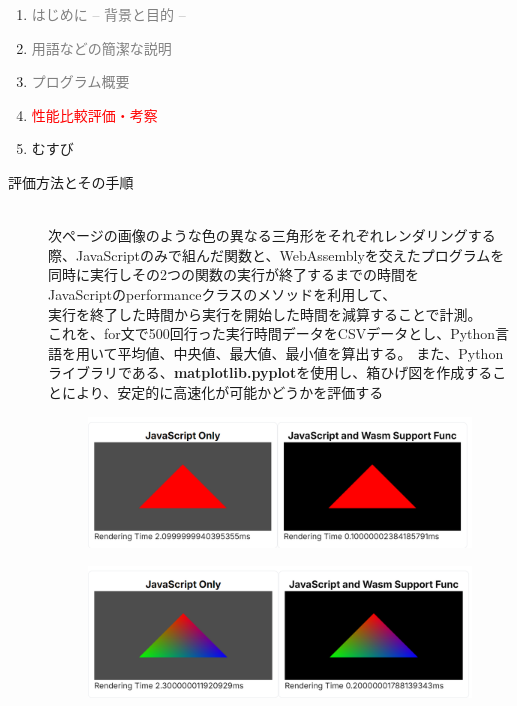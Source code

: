 \begin{enumerate}[itemsep=0.25\zh]
	\item \textcolor{gray}{はじめに -- 背景と目的 --}
	\item \textcolor{gray}{用語などの簡潔な説明}
	\item \textcolor{gray}{プログラム概要}
	\item \textcolor{red}{性能比較評価・考察}
	\item むすび
\end{enumerate}
\newpage


\begin{description}
	
	\item[評価方法とその手順]~\\
	次ページの画像のような色の異なる三角形をそれぞれレンダリングする際、JavaScriptのみで組んだ関数と、WebAssemblyを交えたプログラムを同時に実行しその2つの関数の実行が終了するまでの時間を\\JavaScriptのperformanceクラスのメソッドを利用して、\\実行を終了した時間から実行を開始した時間を減算することで計測。\\
	これを、for文で500回行った実行時間データをCSVデータとし、Python言語を用いて平均値、中央値、最大値、最小値を算出する。
	また、Pythonライブラリである、\textbf{matplotlib.pyplot}を使用し、箱ひげ図を作成することにより、安定的に高速化が可能かどうかを評価する
	\newpage
	\begin{figure}[h]
		\centering
		\begin{minipage}[b]{0.38\columnwidth}
			\centering
			\includegraphics[width=0.9\columnwidth]{normal_triangle.png}
			\label{fig:a}
		\end{minipage}
		\begin{minipage}[b]{0.38\columnwidth}
			\centering
			\includegraphics[width=0.9\columnwidth]{colorful_triangle.png}

\end{minipage}
\end{figure}
\end{description}
